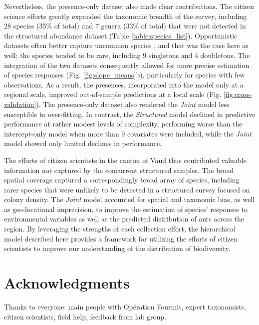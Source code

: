 \documentclass[preprint,final,times,12pt,3p]{elsarticle}
\begin{document}
Nevertheless, the presence-only dataset also made clear contributions. The citizen science efforts greatly expanded the taxonomic breadth of the survey, including 28 species (35\% of total) and 7 genera (33\% of total) that were not detected in the structured abundance dataset (Table \ref{table:species_list}). Opportunistic datasets often better capture uncommon species \citep{Henckel2020}, and that was the case here as well; the species tended to be rare, including 9 singletons and 4 doubletons. The integration of the two datasets consequently allowed for more precise estimation of species responses (Fig. \ref{fig:slope_means}b), particularly for species with few observations. As a result, the presences, incorporated into the model only at a regional scale, improved out-of-sample predictions at a local scale (Fig. \ref{fig:cross-validation}). The presence-only dataset also rendered the \emph{Joint} model less susceptible to over-fitting. In contrast, the \emph{Structured} model declined in predictive performance at rather modest levels of complexity, performing worse than the intercept-only model when more than 9 covariates were included, while the \emph{Joint} model showed only limited declines in performance. 

The efforts of citizen scientists in the canton of Vaud thus contributed valuable information not captured by the concurrent structured samples. The broad spatial coverage captured a correspondingly broad array of species, including rarer species that were unlikely to be detected in a structured survey focused on colony density. The \emph{Joint} model accounted for spatial and taxonomic bias, as well as geo-locational imprecision, to improve the estimation of species' responses to environmental variables as well as the predicted distribution of ants across the region. By leveraging the strengths of each collection effort, the hierarchical model described here provides a framework for utilizing the efforts of citizen scientists to improve our understanding of the distribution of biodiversity.




\section{Acknowledgments}
Thanks to everyone: main people with Opération Fourmis, expert taxonomists, citizen scientists, field help, feedback from lab group.
\end{document}
